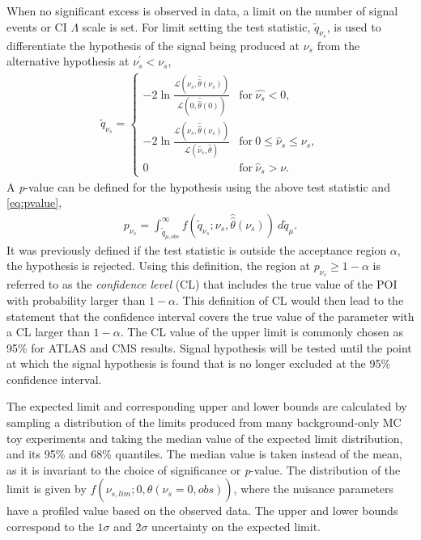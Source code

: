 When no significant excess is observed in data, a limit on the number of signal events or CI $\Lambda$ scale is set. For limit setting the test statistic, $\tilde{q}_{\nu_s}$, is used to differentiate the hypothesis of the signal being produced at $\nu_s$ from the alternative hypothesis at $\nu_s^\prime < \nu_s$,
\begin{equation}
    \label{eq:limitTestStat}
    \begin{aligned}
    \tilde{q}_{\nu_s} = \begin{cases}
        -2\ln\frac{\mathcal{L}(\nu_s,\hat{\hat{\theta}}(\nu_s))}{\mathcal{L}(0,\hat{\hat{\theta}}(0))} & \mathrm{for }~\hat{\nu_s} < 0, \\
        -2\ln\frac{\mathcal{L}(\nu_s,\hat{\hat{\theta}}(\nu_s))}{\mathcal{L}(\hat{\nu}_s,\hat{\theta})} & \mathrm{for }~0 \leq \hat{\nu}_s \leq \nu_s, \\
        0          & \mathrm{for }~\hat{\nu}_s > \nu.
    \end{cases}
    \end{aligned}
\end{equation}
A \emph{p}-value can be defined for the hypothesis using the above test statistic and \cref{eq:pvalue}, 
\begin{equation}
    \label{eq:pvalue_sb}
    \begin{aligned}
        p_{\nu_s} = \int_{\tilde{q}_{\mu,obs}}^\infty f(\tilde{q}_{\nu_s};\nu_s,\hat{\hat{\theta}}(\nu_s))~d\tilde{q}_\mu.
    \end{aligned}
\end{equation}
It was previously defined if the test statistic is outside the acceptance region $\alpha$, the hypothesis is rejected. Using this definition, the region at $p_{\nu_s} \geq 1 - \alpha$ is referred to as the \emph{confidence level} (CL) that includes the true value of the POI with probability larger than $1-\alpha$. This definition of CL would then lead to the statement that the confidence interval covers the true value of the parameter with a CL larger than $1-\alpha$. The CL value of the upper limit is commonly chosen as 95\% for ATLAS and CMS results. Signal hypothesis will be tested until the point at which the signal hypothesis is found that is no longer excluded at the 95\% confidence interval. 

The expected limit and corresponding upper and lower bounds are calculated by sampling a distribution of the limits produced from many background-only MC toy experiments and taking the median value of the expected limit distribution, and its 95\% and 68\% quantiles. The median value is taken instead of the mean, as it is invariant to the choice of significance or \emph{p}-value. The distribution of the limit is given by $f(\nu_{s,lim};0,\hat{\hat{\theta}}(\nu_s = 0,obs))$, where the nuisance parameters have a profiled value based on the observed data. The upper and lower bounds correspond to the $1\sigma$ and $2\sigma$ uncertainty on the expected limit.

